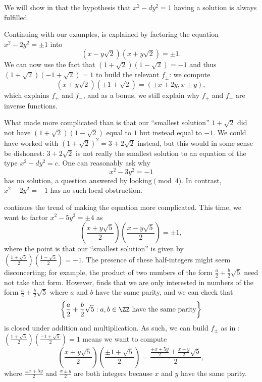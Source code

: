 \documentclass[../notes.tex]{subfiles}
\begin{document}
\begin{remark}
	We will show in  that the hypothesis that $x^2-dy^2=1$ having a solution is always fulfilled.
\end{remark}
Continuing with our examples,  is explained by factoring the equation $x^2-2y^2=\pm1$ into
\[\left(x-y\sqrt2\right)\left(x+y\sqrt2\right)=\pm1.\]
We can now use the fact that $\left(1+\sqrt2\right)\left(1-\sqrt2\right)=-1$ and thus $\left(1+\sqrt2\right)\left(-1+\sqrt2\right)=1$ to build the relevant $f_\pm$: we compute
\[\left(x+y\sqrt2\right)\left(\pm1+\sqrt2\right)=\left(\pm x+2y,x\pm y\right),\]
which explains $f_+$ and $f_-$, and as a bonus, we still explain why $f_+$ and $f_-$ are inverse functions.

What made  more complicated than  is that our ``smallest solution'' $1+\sqrt2$ did not have $\left(1+\sqrt2\right)\left(1-\sqrt2\right)$ equal to $1$ but instead equal to $-1$. We could have worked with $\left(1+\sqrt2\right)^2=3+2\sqrt2$ instead, but this would in some sense be dishonest: $3+2\sqrt2$ is not really the smallest solution to an equation of the type $x^2-dy^2=c$. One can reasonably ask why
\[x^2-3y^2=-1\]
has no solution, a question answered by looking$\pmod4$. In contrast, $x^2-2y^2=-1$ has no such local obstruction.

 continues the trend of making the equation more complicated. This time, we want to factor $x^2-5y^2=\pm4$ as
\[\left(\frac{x+y\sqrt5}2\right)\left(\frac{x-y\sqrt5}2\right)=\pm1,\]
where the point is that our ``smallest solution'' is given by $\left(\frac{1+\sqrt5}2\right)\left(\frac{1-\sqrt5}2\right)=-1$. The presence of these half-integers might seem disconcerting; for example, the product of two numbers of the form $\frac a2+\frac b2\sqrt5$ need not take that form. However,  finds that we are only interested in numbers of the form $\frac a2+\frac b2\sqrt5$ where $a$ and $b$ have the same parity, and we can check that
\[\left\{\frac a2+\frac b2\sqrt5:a,b\in\ZZ\text{ have the same parity}\right\}\]
is closed under addition and multiplication. As such, we can build $f_\pm$ as in : $\left(\frac{1+\sqrt5}2\right)\left(\frac{-1+\sqrt5}2\right)=1$ means we want to compute
\[\left(\frac{x+y\sqrt5}2\right)\left(\frac{\pm1+\sqrt5}2\right)=\frac{\frac{\pm x+5y}2+\frac{x\pm y}2\sqrt5}2,\]
where $\frac{\pm x+5y}2$ and $\frac{x\pm y}2$ are both integers because $x$ and $y$ have the same parity.
\end{document}
